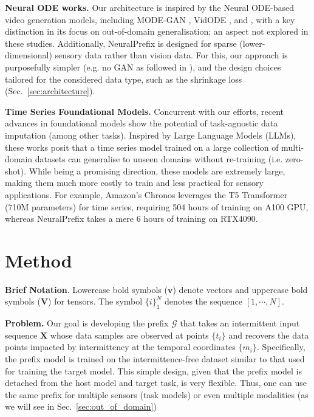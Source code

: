 \documentclass[10pt, conference, compsocconf]{IEEEtran}
\def\update#1{#1}
\begin{document}
\textbf{Neural ODE works.} Our architecture is inspired by the Neural ODE-based video generation models, including MODE-GAN  \cite{kim2021continuous} , VidODE \cite{park2021vid}, and \cite{kim2021continuous}, with a key distinction in its focus on out-of-domain generalisation; an aspect not explored in these studies. Additionally, NeuralPrefix is designed for sparse (\update{lower-dimensional}) sensory data rather than vision data. For this, our approach is purposefully simpler (e.g. no GAN as followed in \cite{park2021vid, kim2021continuous}), and the design choices tailored for the considered data type, such as the shrinkage loss (Sec.~\ref{sec:architecture}). 

\update{\textbf{Time Series Foundational Models.} Concurrent with our efforts, recent advances in foundational models show the potential of task-agnostic data imputation (among other tasks).  Inspired by Large Language Models (LLMs), these works \cite{ansari2024chronos}  posit that a time series model trained on a large collection of multi-domain datasets can generalise to unseen domains without re-training (i.e. zero-shot). While being a promising direction, these models are extremely large, making them much more costly to train and less practical for sensory applications.  For example, Amazon's Chronos \cite{ansari2024chronos} leverages the T5 Transformer (710M parameters) for time series, requiring 504 hours of training on A100 GPU, whereas NeuralPrefix takes a mere 6 hours of training on RTX4090. }


\section{Method}


\textbf{Brief Notation}. Lowercase bold symbols ($\mathbf{v}$) denote vectors and uppercase bold symbols ($\mathbf{V}$) for tensors. The symbol $\big\{i\big\}_{1}^{N}$  denotes the sequence
$[1, \cdots, N]$.  

\textbf{Problem.} Our goal is developing the prefix  
$\mathcal{G}$
that takes an intermittent input sequence $\mathbf{X}$ whose data samples \update{are observed} at points $\{t_i\}$ and recovers the data points impacted by intermittency at the temporal coordinates $\{m_i\}$. 
Specifically, the prefix model is trained on the intermittence-free dataset similar to that used for training the target model. 
This simple design, given that the prefix model is \update{detached from the host model} and target task, is very flexible. \update{Thus,} one can use the same prefix for multiple sensors (task models) or even multiple modalities (as we will see in Sec.~\ref{sec:out_of_domain}) 
\end{document}
